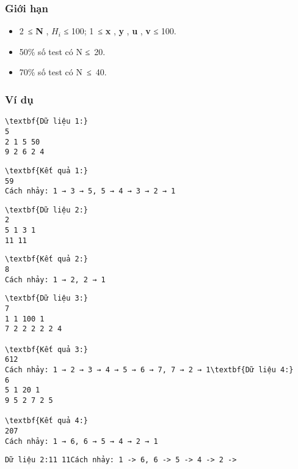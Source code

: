 \subsubsection{   Giới hạn  }
\begin{itemize}
	\item     2 ≤    \textbf{     N    }    ,    \textbf{     $H_{i}$}    ≤ 100; 1 ≤    \textbf{     x    }    ,    \textbf{     y    }    ,    \textbf{     u    }    ,    \textbf{     v    }    ≤ 100.   
	\item     50\% số test có N ≤ 20.   
	\item     70\% số test có N ≤ 40.   
\end{itemize}

\subsubsection{   Ví dụ  }
\begin{verbatim}
\textbf{Dữ liệu 1:}
5
2 1 5 50
9 2 6 2 4\end{verbatim}
\begin{verbatim}
\textbf{Kết quả 1:}
59
Cách nhảy: 1 → 3 → 5, 5 → 4 → 3 → 2 → 1\end{verbatim}
\begin{verbatim}
\textbf{Dữ liệu 2:}
2
5 1 3 1
11 11\end{verbatim}
\begin{verbatim}
\textbf{Kết quả 2:}
8
Cách nhảy: 1 → 2, 2 → 1\end{verbatim}
\begin{verbatim}
\textbf{Dữ liệu 3:}
7
1 1 100 1
7 2 2 2 2 2 4

\textbf{Kết quả 3:}
612
Cách nhảy: 1 → 2 → 3 → 4 → 5 → 6 → 7, 7 → 2 → 1\textbf{Dữ liệu 4:}
6
5 1 20 1
9 5 2 7 2 5

\textbf{Kết quả 4:}
207
Cách nhảy: 1 → 6, 6 → 5 → 4 → 2 → 1\end{verbatim}
\begin{verbatim}
Dữ liệu 2:11 11Cách nhảy: 1 -> 6, 6 -> 5 -> 4 -> 2 -> \end{verbatim}
